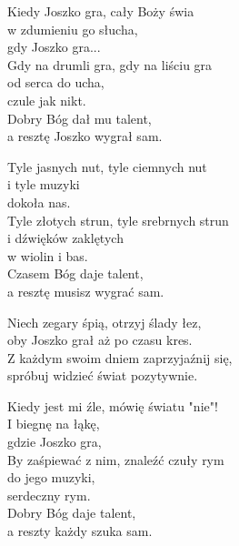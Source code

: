 \begin{text}
    Kiedy Joszko gra, cały Boży świa\\
    w zdumieniu go słucha,\\
    gdy Joszko gra...\\
    Gdy na drumli gra, gdy na liściu gra\\
    od serca do ucha,\\
    czule jak nikt.\\
    Dobry Bóg dał mu talent,\\
    a resztę Joszko wygrał sam.

    Tyle jasnych nut, tyle ciemnych nut\\
    i tyle muzyki\\
    dokoła nas.\\
    Tyle złotych strun, tyle srebrnych strun\\
    i dźwięków zaklętych\\
    w wiolin i bas.\\
    Czasem Bóg daje talent,\\
    a resztę musisz wygrać sam.

    \vin Niech zegary śpią, otrzyj ślady łez,\\
    \vin oby Joszko grał aż po czasu kres.\\
    \vin Z każdym swoim dniem zaprzyjaźnij się,\\
    \vin spróbuj widzieć świat pozytywnie.

    Kiedy jest mi źle, mówię światu "nie"!\\
    I biegnę na łąkę,\\
    gdzie Joszko gra,\\
    By zaśpiewać z nim, znaleźć czuły rym\\
    do jego muzyki,\\
    serdeczny rym.\\
    Dobry Bóg daje talent,\\
    a reszty każdy szuka sam.
\end{text}
